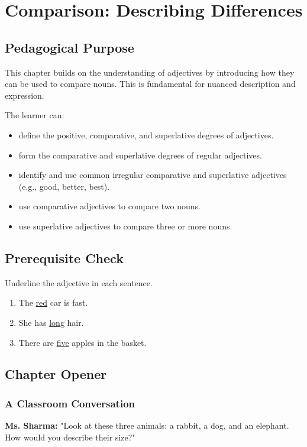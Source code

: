 
\chapter{Comparison: Describing Differences}

\section{Pedagogical Purpose}
This chapter builds on the understanding of adjectives by introducing how they can be used to compare nouns. This is fundamental for nuanced description and expression.

\begin{learningobjectives}
The learner can:
\begin{itemize}
    \item define the positive, comparative, and superlative degrees of adjectives.
    \item form the comparative and superlative degrees of regular adjectives.
    \item identify and use common irregular comparative and superlative adjectives (e.g., good, better, best).
    \item use comparative adjectives to compare two nouns.
    \item use superlative adjectives to compare three or more nouns.
\end{itemize}
\end{learningobjectives}

\section{Prerequisite Check}
\begin{quickcheck}
Underline the adjective in each sentence.
\begin{enumerate}
    \item The \underline{red} car is fast.
    \item She has \underline{long} hair.
    \item There are \underline{five} apples in the basket.
\end{enumerate}
\end{quickcheck}

\section{Chapter Opener}
\subsection*{A Classroom Conversation}
\textbf{Ms. Sharma:} "Look at these three animals: a rabbit, a dog, and an elephant. How would you describe their size?"

